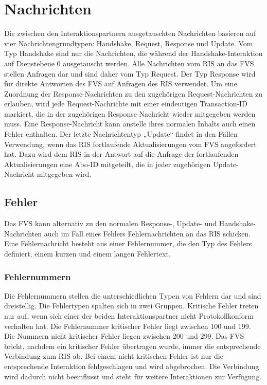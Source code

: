 \chapter{Nachrichten}
\label{sec:Nachrichten}
Die zwischen den Interaktionspartnern ausgetauschten Nachrichten basieren auf vier Nachrichtengrundtypen: Handshake, Request, Response und Update. Vom Typ Handshake sind nur die Nachrichten, die während der Handshake-Interaktion auf Dienstebene 0 ausgetauscht werden. Alle Nachrichten vom RIS an das FVS stellen Anfragen dar und sind daher vom Typ Request. Der Typ Response wird für direkte Antworten des FVS auf Anfragen des RIS verwendet. Um eine Zuordnung der Response-Nachrichten zu den zugehörigen Request-Nachrichten zu erlauben, wird jede Request-Nachrichte mit einer eindeutigen Transaction-ID markiert, die in der zugehörigen Response-Nachricht wieder mitgegeben werden muss. Eine Response-Nachricht kann anstelle ihres normalen Inhalts auch einen Fehler enthalten. Der letzte Nachrichtentyp „Update“ findet in den Fällen Verwendung, wenn das RIS fortlaufende Aktualisierungen vom FVS angefordert hat. Dazu wird dem RIS in der Antwort auf die Anfrage der fortlaufenden Aktualisierungen eine Abo-ID mitgeteilt, die in jeder zugehörigen Update-Nachricht mitgegeben wird.



\section{Fehler}
Das FVS kann alternativ zu den normalen Response-, Update- und Handshake-Nachrichten auch im Fall eines Fehlers Fehlernachrichten an das RIS schicken. Eine Fehlernachricht besteht aus einer Fehlernummer, die den Typ des Fehlers definiert, einem kurzen und einem langen Fehlertext.



\subsection{Fehlernummern}
Die Fehlernummern stellen die unterschiedlichen Typen von Fehlern dar und sind dreistellig. Die Fehlertypen spalten sich in zwei Gruppen. Kritische Fehler treten nur auf, wenn sich einer der beiden Interaktionspartner nicht Protokollkonform verhalten hat. Die Fehlernummer kritischer Fehler liegt zwischen 100 und 199. Die Nummern nicht kritischer Fehler liegen zwischen 200 und 299. Das FVS bricht, nachdem ein kritischer Fehler übertragen wurde, immer die entsprechende Verbindung zum RIS ab. Bei einem nicht kritischen Fehler ist nur die entsprechende Interaktion fehlgeschlagen und wird abgebrochen. Die Verbindung wird dadurch nicht beeinflusst und steht für weitere Interaktionen zur Verfügung.

